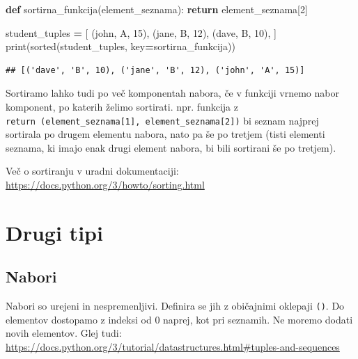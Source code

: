 \documentclass[
]{book}
\newenvironment{Shaded}{\begin{snugshade}}{\end{snugshade}}
\newcommand{\BuiltInTok}[1]{#1}
\newcommand{\ControlFlowTok}[1]{\textcolor[rgb]{0.13,0.29,0.53}{\textbf{#1}}}
\newcommand{\DecValTok}[1]{\textcolor[rgb]{0.00,0.00,0.81}{#1}}
\newcommand{\KeywordTok}[1]{\textcolor[rgb]{0.13,0.29,0.53}{\textbf{#1}}}
\newcommand{\NormalTok}[1]{#1}
\newcommand{\OperatorTok}[1]{\textcolor[rgb]{0.81,0.36,0.00}{\textbf{#1}}}
\newcommand{\StringTok}[1]{\textcolor[rgb]{0.31,0.60,0.02}{#1}}
\begin{document}
\begin{Shaded}
\begin{Highlighting}[]
\KeywordTok{def}\NormalTok{ sortirna\_funkcija(element\_seznama):}
    \ControlFlowTok{return}\NormalTok{ element\_seznama[}\DecValTok{2}\NormalTok{]}

\NormalTok{student\_tuples }\OperatorTok{=}\NormalTok{ [}
\NormalTok{    (}\StringTok{\textquotesingle{}john\textquotesingle{}}\NormalTok{, }\StringTok{\textquotesingle{}A\textquotesingle{}}\NormalTok{, }\DecValTok{15}\NormalTok{),}
\NormalTok{    (}\StringTok{\textquotesingle{}jane\textquotesingle{}}\NormalTok{, }\StringTok{\textquotesingle{}B\textquotesingle{}}\NormalTok{, }\DecValTok{12}\NormalTok{),}
\NormalTok{    (}\StringTok{\textquotesingle{}dave\textquotesingle{}}\NormalTok{, }\StringTok{\textquotesingle{}B\textquotesingle{}}\NormalTok{, }\DecValTok{10}\NormalTok{),}
\NormalTok{]}
\BuiltInTok{print}\NormalTok{(}\BuiltInTok{sorted}\NormalTok{(student\_tuples, key}\OperatorTok{=}\NormalTok{sortirna\_funkcija))}
\end{Highlighting}
\end{Shaded}

\begin{verbatim}
## [('dave', 'B', 10), ('jane', 'B', 12), ('john', 'A', 15)]
\end{verbatim}

Sortiramo lahko tudi po več komponentah nabora, če v funkciji vrnemo nabor komponent, po katerih želimo sortirati. npr. funkcija z \texttt{return\ (element\_seznama{[}1{]},\ element\_seznama{[}2{]})} bi seznam najprej sortirala po drugem elementu nabora, nato pa še po tretjem (tisti elementi seznama, ki imajo enak drugi element nabora, bi bili sortirani še po tretjem).

Več o sortiranju v uradni dokumentaciji: \url{https://docs.python.org/3/howto/sorting.html}

\hypertarget{drugi-tipi}{%
\section{Drugi tipi}\label{drugi-tipi}}

\hypertarget{nabori}{%
\subsection{Nabori}\label{nabori}}

Nabori so urejeni in nespremenljivi. Definira se jih z običajnimi oklepaji \texttt{()}. Do elementov dostopamo z indeksi od 0 naprej, kot pri seznamih. Ne moremo dodati novih elementov. Glej tudi: \url{https://docs.python.org/3/tutorial/datastructures.html\#tuples-and-sequences}
\end{document}
